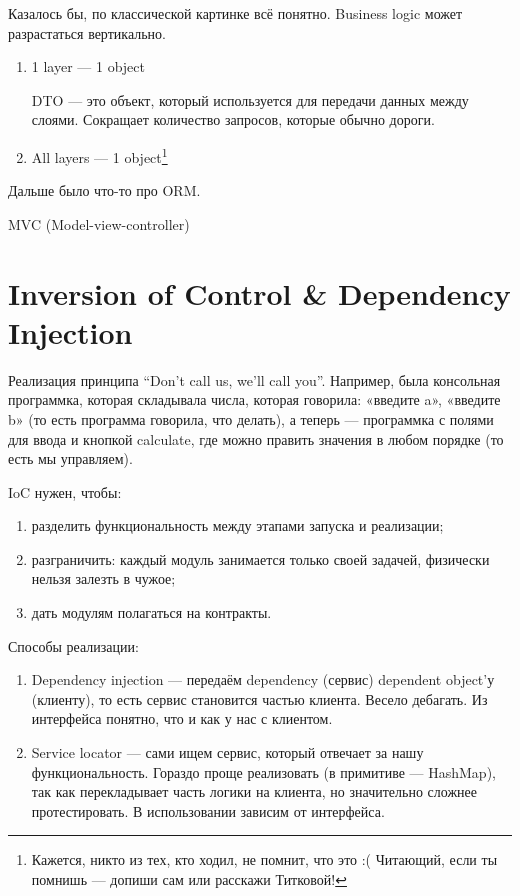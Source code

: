 \documentclass[11pt,a4paper]{article}
\begin{document}
Казалось бы, по классической картинке всё понятно. Business logic может разрастаться вертикально.

\begin{enumerate}
\item 1 layer — 1 object

DTO — это объект, который используется для передачи данных между слоями. Сокращает количество запросов, которые обычно дороги.
\item All layers — 1 object\footnote{Кажется, никто из тех, кто ходил, не помнит, что это :( Читающий, если ты помнишь — допиши сам или расскажи Титковой!}
\end{enumerate}

Дальше было что-то про ORM.

MVC (Model-view-controller)

\section{Inversion of Control \& Dependency Injection}
Реализация принципа ``Don't call us, we'll call you''. Например, была консольная программка, которая складывала числа, которая говорила: «введите a», «введите b» (то есть программа говорила, что делать), а теперь — программка с полями для ввода и кнопкой calculate, где можно править значения в любом порядке (то есть мы управляем).

IoC нужен, чтобы:
\begin{enumerate}
\item разделить функциональность между этапами запуска и реализации;
\item разграничить: каждый модуль занимается только своей задачей, физически нельзя залезть в чужое;
\item дать модулям полагаться на контракты.
\end{enumerate}

Способы реализации:
\begin{enumerate}
\item Dependency injection — передаём dependency (сервис) dependent object'у (клиенту), то есть сервис становится частью клиента. Весело дебагать. Из интерфейса понятно, что и как у нас с клиентом.
\item Service locator — сами ищем сервис, который отвечает за нашу функциональность. Гораздо проще реализовать (в примитиве — HashMap), так как перекладывает часть логики на клиента, но значительно сложнее протестировать. В использовании зависим от интерфейса.
\end{enumerate}
\end{document}

